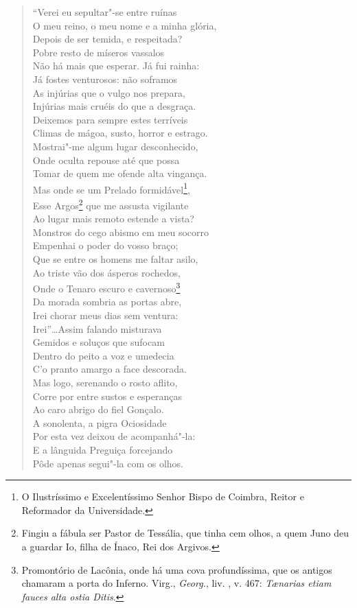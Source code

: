 \begin{verse}
``Verei eu sepultar"-se entre ruínas\\
O meu reino, o meu nome e a minha glória,\\
Depois de ser temida, e respeitada?\\
Pobre resto de míseros vassalos\\
Não há mais que esperar. Já fui rainha:\\
Já fostes venturosos: não soframos\\
As injúrias que o vulgo nos prepara,\\
Injúrias mais cruéis do que a desgraça.\\
Deixemos para sempre estes terríveis\\
Climas de mágoa, susto, horror e estrago.\\
Mostrai"-me algum lugar desconhecido,\\
Onde oculta repouse até que possa\\
Tomar de quem me ofende alta vingança.\\
Mas onde se um Prelado formidável\footnote{ O Ilustríssimo e
Excelentíssimo Senhor Bispo de Coimbra, Reitor e Reformador da Universidade.},\\
Esse Argos\footnote{ Fingiu a fábula ser Pastor de Tessália, que tinha
cem olhos, a quem Juno deu a guardar Io, filha de Ínaco, Rei dos Argivos.} que
me assusta vigilante\\			\index{\Fabula}
Ao lugar mais remoto estende a vista?\\
Monstros do cego abismo em meu socorro\\
Empenhai o poder do vosso braço;\\
Que se entre os homens me faltar asilo,\\
Ao triste vão dos ásperos rochedos,\\
Onde o Tenaro escuro e cavernoso\footnote{ Promontório de Lacônia,
onde há uma cova profundíssima, que os antigos chamaram a porta do Inferno.
Virg., \textit{Georg.}, liv. , v. 467: \textit{T\ae narias etiam fauces alta
ostia Ditis}.}\\
Da morada sombria as portas abre,\\
Irei chorar meus dias sem ventura:\\
Irei''\ldots Assim falando misturava\\
Gemidos e soluços que sufocam\\
Dentro do peito a voz e umedecia\\
C'o pranto amargo a face descorada.\\
Mas logo, serenando o rosto aflito,\\
Corre por entre sustos e esperanças\\
Ao caro abrigo do fiel Gonçalo.\\
A sonolenta, a pigra Ociosidade\\
Por esta vez deixou de acompanhá"-la:\\
E a lânguida Preguiça forcejando\\
Pôde apenas segui"-la com os olhos. \\[10pt]



\end{verse}
